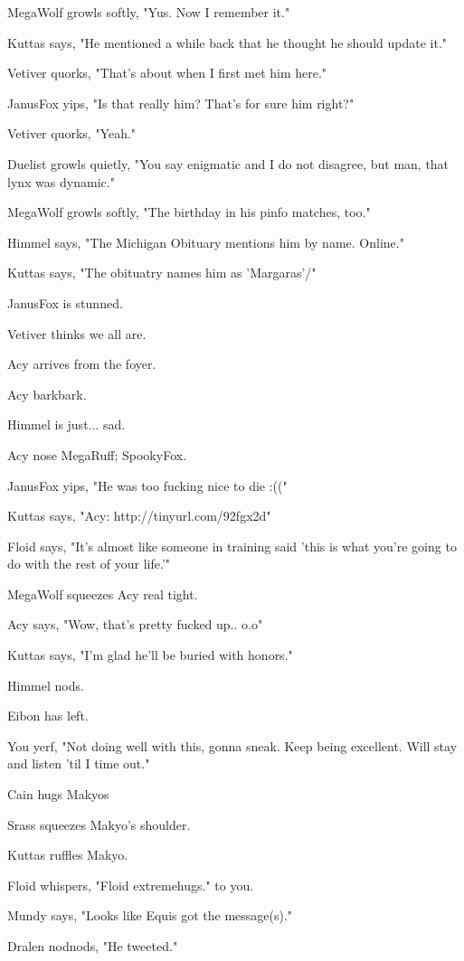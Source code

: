 MegaWolf growls softly, "Yus. Now I remember it."

Kuttas says, "He mentioned a while back that he thought he should update it."

Vetiver quorks, "That's about when I first met him here."

JanusFox yips, "Is that really him?  That's for sure him right?"

Vetiver quorks, "Yeah."

Duelist growls quietly, "You say enigmatic and I do not disagree, but man, that lynx was dynamic."

MegaWolf growls softly, "The birthday in his pinfo matches, too."

Himmel says, "The Michigan Obituary mentions him by name. Online."

Kuttas says, "The obituatry names him as 'Margaras'/"

JanusFox is stunned.

Vetiver thinks we all are.

Acy arrives from the foyer.

Acy barkbark.

Himmel is just... sad.

Acy nose MegaRuff; SpookyFox.

JanusFox yips, "He was too fucking nice to die :(("

Kuttas says, "Acy: http://tinyurl.com/92fgx2d"

Floid says, "It's almost like someone in training said 'this is what you're going to do with the rest of your life.'"

MegaWolf squeezes Acy real tight.

Acy says, "Wow, that's pretty fucked up.. o.o"

Kuttas says, "I'm glad he'll be buried with honors."

Himmel nods.

Eibon has left.

You yerf, "Not doing well with this, gonna sneak.  Keep being excellent.  Will stay and listen 'til I time out."

Cain hugs Makyos

Srass squeezes Makyo's shoulder.

Kuttas ruffles Makyo.

Floid whispers, "Floid extremehugs." to you.

Mundy says, "Looks like Equis got the message(s)."

Dralen nodnods, "He tweeted."

